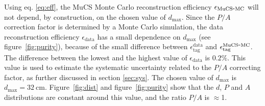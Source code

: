 \documentclass[a4paper,11pt]{article}
\def\myhyphen{{\hbox{-}}}
\begin{document}
Using eq. \eqref{eq:eff}, the MuCS Monte Carlo reconstruction efficiency $\epsilon_{\mathrm{MuCS\myhyphen MC}}$ will not depend, by construction, on the chosen value of $d_{\mathrm{max}}$. Since the $P/A$ correction factor is determined by a Monte Carlo simulation, the data reconstruction efficiency $\epsilon_{\mathrm{data}}$ has a small dependence on $d_{\mathrm{max}}$ (see figure~\ref{fig:purity}), because of the small difference between $\epsilon^{\mathrm{data}}_{\mathrm{tag}}$ and $\epsilon^{\mathrm{MuCS\myhyphen MC}}_{\mathrm{tag}}$.
The difference between the lowest and the highest value of $\epsilon_{\mathrm{data}}$ is $0.2\%$. This value is used to estimate the systematic uncertainty related to the $P/A$ correcting factor, as further discussed in section \ref{sec:sys}.
The chosen value of $d_{\mathrm{max}}$ is $d_{\mathrm{max}}=32~\mathrm{cm}$. Figure~\ref{fig:dist} and figure~\ref{fig:purity} show that the $d$, $P$ and $A$ distributions are constant around this value, and the ratio $P/A$ is $\approx$1.%


\end{document}
